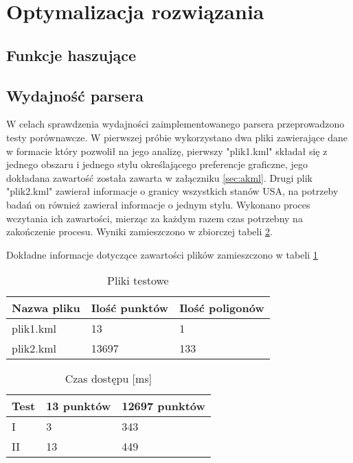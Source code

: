 ﻿\section{Optymalizacja rozwiązania}
\label{sec:optymalizacja}

\subsection{Funkcje haszujące}
\label{sec:hashfunction}

\subsection{Wydajność parsera}
\label{subsec:wydajnosc}

W celach sprawdzenia wydajności zaimplementowanego parsera przeprowadzono testy porównawcze. W pierwszej próbie wykorzystano dwa pliki zawierające dane w formacie który pozwolił na jego analizę, pierwszy "plik1.kml" składał się z jednego obszaru i jednego stylu określającego preferencje graficzne, jego dokładana zawartość została zawarta w załączniku \ref{sec:akml}. Drugi plik "plik2.kml" zawierał informacje o granicy wszystkich stanów USA, na potrzeby badań on również zawierał informacje o jednym stylu.
Wykonano proces wczytania ich zawartości, mierząc za każdym razem czas potrzebny na zakończenie procesu. Wyniki zamieszczono w zbiorczej tabeli \ref{tab:speedTest}.

Dokładne informacje dotyczące zawartości plików zamieszczono w tabeli \ref{tab:testFile}

\begin{table}[H]
    \centering
    \begin{tabular}{|l|l|l|}
    \hline
    Nazwa pliku & Ilość punktów & Ilość poligonów \\ \hline
    plik1.kml & 13 & 1 \\ \hline
    plik2.kml & 13697 & 133 \\ \hline

    \end{tabular}
    \caption{Pliki testowe}
    \label{tab:testFile}
\end{table}


\begin{table} [H]
    \centering
    \begin{tabular}{|l|l|l|}
    \hline
    Test & 13 punktów & 12697 punktów \\\hline
    I & 3 & 343 \\\hline
    II & 13 & 449 \\\hline

    \end{tabular}
    \caption{Czas dostępu [ms]}
    \label{tab:speedTest}
\end{table}

